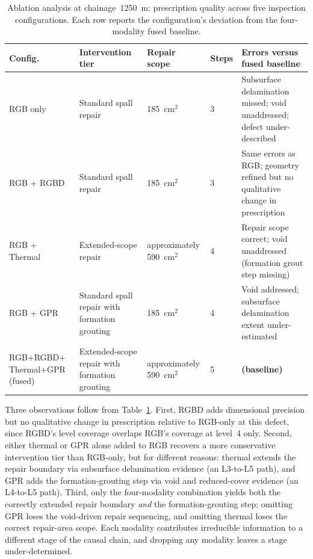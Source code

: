 \documentclass[11pt,a4paper]{article}
\begin{document}
\begin{table}[htbp]
\centering
\caption{Ablation analysis at chainage~1250~m: prescription quality
  across five inspection configurations. Each row reports the
  configuration's deviation from the four-modality fused baseline.}
\label{tab:ablation}
\begin{tabularx}{\textwidth}{p{2.3cm} p{2.7cm} p{2.3cm} p{1.5cm} X}
\toprule
\textbf{Config.} & \textbf{Intervention tier} & \textbf{Repair scope}
  & \textbf{Steps} & \textbf{Errors versus fused baseline} \\
\midrule
RGB only & Standard spall repair & 185~cm$^2$ & 3 & Subsurface
  delamination missed; void unaddressed; defect under-described \\
RGB + RGBD & Standard spall repair & 185~cm$^2$ & 3 & Same errors as
  RGB; geometry refined but no qualitative change in prescription \\
RGB + Thermal & Extended-scope repair & approximately 590~cm$^2$ &
  4 & Repair scope correct; void unaddressed (formation grout step
  missing) \\
RGB + GPR & Standard spall repair with formation grouting &
  185~cm$^2$ & 4 & Void addressed; subsurface delamination extent
  under-estimated \\
RGB+RGBD+ Thermal+GPR (fused) & Extended-scope repair with formation
  grouting & approximately 590~cm$^2$ & 5 & \textbf{(baseline)} \\
\bottomrule
\end{tabularx}
\end{table}

Three observations follow from Table~\ref{tab:ablation}. First, RGBD adds dimensional precision but no qualitative change in prescription
relative to RGB-only at this defect, since RGBD's level coverage overlaps RGB's coverage at level~4 only. Second, either thermal or GPR alone added to RGB recovers a more conservative intervention tier than RGB-only, but for different reasons: thermal extends the repair boundary via subsurface delamination evidence (an L3-to-L5 path), and GPR adds the formation-grouting step via void and reduced-cover evidence (an L4-to-L5 path). Third, only the four-modality combination yields both the correctly extended repair boundary \emph{and} the formation-grouting step; omitting GPR loses the void-driven repair sequencing, and omitting thermal loses the correct repair-area scope. Each modality contributes irreducible information to a different stage of the causal chain, and dropping any modality leaves a stage under-determined.
\end{document}
